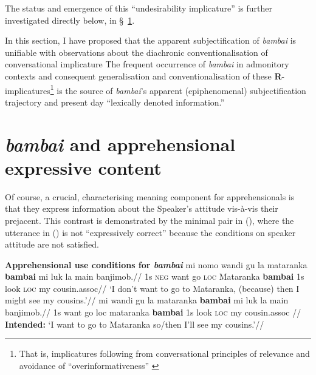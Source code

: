 \noindent The status and emergence of this ``undesirability implicature'' is further investigated directly below, in \S~\ref{bambai.expr}.


In this section, I have proposed that the apparent subjectification of \textit{bambai} is unifiable with observations about the diachronic conventionalisation of conversational implicature \citetext{\citealp[\textit{e.g.},][273\textit{ff}]{Cole1975} and especially Traugott's invited inferencing theory of semantic change (\citeyear{Traugott1980} \textit{et seq.})} The frequent occurrence of \textit{bambai} in admonitory contexts and consequent generalisation and conventionalisation of these \textbf{R}-implicatures\footnote{That is, implicatures following from conversational principles of relevance and avoidance of ``overinformativeness'' \citetext{\citealp{Horn1984} \textit{et seq.}}} is the source of \textit{bambai}'s apparent (epiphenomenal) subjectification trajectory and present day ``lexically denoted information.''

\section[Use conditions]{\textit{bambai} and apprehensional expressive content} \label{bambai.expr}


Of course, a crucial, characterising meaning component for apprehensionals is that they express information about the Speaker's attitude vis-à-vis their prejacent. This contrast is demonstrated by the minimal pair in (), where the utterance in () is not ``expressively correct'' \citep[\textit{cf.}][]{Kaplan1999} because the conditions on speaker attitude are not satisfied.



\pex \textbf{Apprehensional use conditions for \textit{bambai}}
\a\begingl%
\gla mi nomo wandi gu la mataranka \textbf{bambai} mi luk la main banjimob.//
\glb 1s \textsc{neg} want go \textsc{loc} Mataranka \textbf{bambai} 1s look \textsc{loc} my cousin.\gls{assoc}//
\glft`I don't want to go to Mataranka, (because) then I might see my cousins.'//\endgl
\a\begingl\gla{}mi wandi gu la mataranka \textbf{bambai} mi luk la main banjimob.//
\glb 1s want go {\sc loc} mataranka \textbf{bambai} 1s look \textsc{loc} my cousin.\gls{assoc}	//
\glft\textbf{Intended:} `I want to go to Mataranka so/then I'll see my cousins.'\trailingcitation{[AJ~072017]}//\endgl\xe





